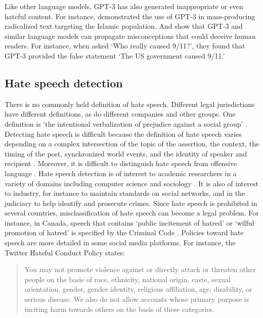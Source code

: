 \documentclass{bmcart}
\begin{document}
Like other language models, GPT-3 has also generated inappropriate or even hateful content. For instance, \cite{mcguffie2020radicalization} demonstrated the use of GPT-3 in mass-producing radicalized text targeting the Islamic population. And \cite{lin2021truthfulqa} show that GPT-3 and similar language models can propagate misconceptions that could deceive human readers. For instance, when asked `Who really caused 9/11?', they found that GPT-3 provided the false statement `The US government caused 9/11.'

\subsection{Hate speech detection}\label{hate-speech-detection}

There is no commonly held definition of hate speech. Different legal jurisdictions have different definitions, as do different companies and other groups. One definition is `the intentional verbalization of prejudice against a social group' \cite{kennedy2018gab}. Detecting hate speech is difficult because the definition of hate speech varies depending on a complex intersection of the topic of the assertion, the context, the timing of the post, synchronized world events, and the identity of speaker and recipient \cite{schmidt2017survey}. Moreover, it is difficult to distinguish hate speech from offensive language \cite{davidson2017automated}. Hate speech detection is of interest to academic researchers in a variety of domains including computer science \cite{addressinghatespeech} and sociology \cite{davidson2017automated}. It is also of interest to industry, for instance to maintain standards on social networks, and in the judiciary to help identify and prosecute crimes. Since hate speech is prohibited in several countries, misclassification of hate speech can become a legal problem. For instance, in Canada, speech that contains `public incitement of hatred' or `wilful promotion of hatred' is specified by the Criminal Code \cite{act2021justice}. Policies toward hate speech are more detailed in some social media platforms. For instance, the Twitter Hateful Conduct Policy states:

\begin{quote}
You may not promote violence against or directly attack or threaten other people on the basis of race, ethnicity, national origin, caste, sexual orientation, gender, gender identity, religious affiliation, age, disability, or serious disease. We also do not allow accounts whose primary purpose is inciting harm towards others on the basis of these categories.

\cite{twitterpolicy2017}
\end{quote}
\end{document}
